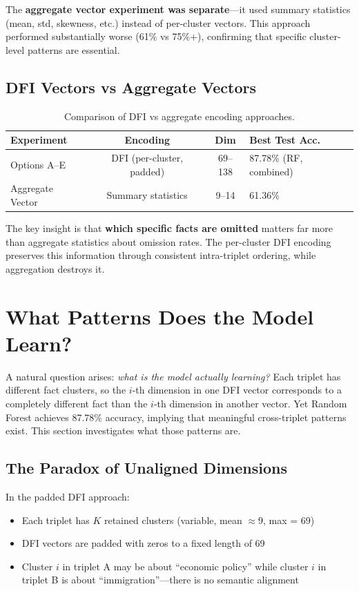 \documentclass[12pt,a4paper]{article}
\begin{document}
The \textbf{aggregate vector experiment was separate}---it used summary statistics (mean, std,
skewness, etc.) instead of per-cluster vectors. This approach performed substantially worse
(61\% vs 75\%+), confirming that specific cluster-level patterns are essential.

\subsection{DFI Vectors vs Aggregate Vectors}

\begin{table}[h]
\centering
\begin{tabular}{lccl}
\hline
\textbf{Experiment} & \textbf{Encoding} & \textbf{Dim} & \textbf{Best Test Acc.} \\
\hline
Options A--E & DFI (per-cluster, padded) & 69--138 & 87.78\% (RF, combined) \\
Aggregate Vector & Summary statistics & 9--14 & 61.36\% \\
\hline
\end{tabular}
\caption{Comparison of DFI vs aggregate encoding approaches.}
\label{tab:dfi_vs_aggregate}
\end{table}

The key insight is that \textbf{which specific facts are omitted} matters far more than
aggregate statistics about omission rates. The per-cluster DFI encoding preserves this
information through consistent intra-triplet ordering, while aggregation destroys it.

\section{What Patterns Does the Model Learn?}

A natural question arises: \textit{what is the model actually learning?} Each triplet has
different fact clusters, so the $i$-th dimension in one DFI vector corresponds to a completely
different fact than the $i$-th dimension in another vector. Yet Random Forest achieves 87.78\%
accuracy, implying that meaningful cross-triplet patterns exist. This section investigates
what those patterns are.

\subsection{The Paradox of Unaligned Dimensions}

In the padded DFI approach:
\begin{itemize}
\item Each triplet has $K$ retained clusters (variable, mean $\approx 9$, max = 69)
\item DFI vectors are padded with zeros to a fixed length of 69
\item Cluster $i$ in triplet A may be about ``economic policy'' while cluster $i$ in triplet B
      is about ``immigration''---there is no semantic alignment
\end{itemize}
\end{document}
